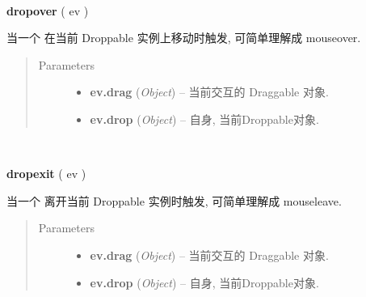 \documentclass[letterpaper,10pt,english]{sphinxmanual}
\begin{document}

\begin{fulllineitems}
\label{api/component/dd/droppable:Droppable.dropover}~
\begin{DUlineblock}{0em}
\item[] \textbf{dropover} ( ev )
\item[] 当一个 {\hyperref[api/component/dd/draggable:module-Draggable]{}} 在当前 Droppable 实例上移动时触发, 可简单理解成 mouseover.
\end{DUlineblock}
\begin{quote}\begin{description}
\item[{Parameters}] \leavevmode\begin{itemize}
\item {}
\textbf{ev.drag} (\emph{Object}) -- 当前交互的 Draggable 对象.

\item {}
\textbf{ev.drop} (\emph{Object}) -- 自身, 当前Droppable对象.

\end{itemize}

\end{description}\end{quote}

\end{fulllineitems}



\begin{fulllineitems}
\label{api/component/dd/droppable:Droppable.dropexit}~
\begin{DUlineblock}{0em}
\item[] \textbf{dropexit} ( ev )
\item[] 当一个 {\hyperref[api/component/dd/draggable:module-Draggable]{}} 离开当前 Droppable 实例时触发, 可简单理解成 mouseleave.
\end{DUlineblock}
\begin{quote}\begin{description}
\item[{Parameters}] \leavevmode\begin{itemize}
\item {}
\textbf{ev.drag} (\emph{Object}) -- 当前交互的 Draggable 对象.

\item {}
\textbf{ev.drop} (\emph{Object}) -- 自身, 当前Droppable对象.

\end{itemize}

\end{description}\end{quote}

\end{fulllineitems}
\end{document}
